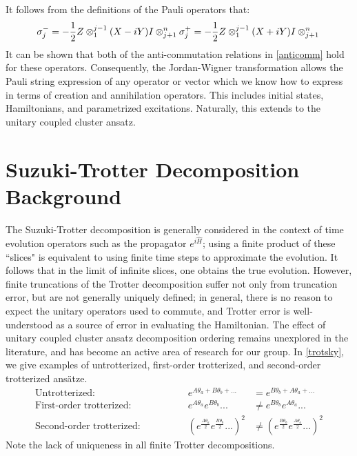 \documentclass{article}
\begin{document}
\begin{paragraph}{}
It follows from the definitions of the Pauli operators that: 
\begin{equation}\label{sigmat}
\sigma_j^- = -\frac{1}{2}Z\otimes_1^{j-1}(X-iY)I\otimes_{j+1}^n\\
\sigma_j^+ = -\frac{1}{2}Z\otimes_1^{j-1}(X+iY)I\otimes_{j+1}^n\\
\end{equation}
It can be shown that both of the anti-commutation relations in \ref{anticomm} hold for these operators.  Consequently, the Jordan-Wigner transformation allows the Pauli string expression of any operator or vector which we know how to express in terms of creation and annihilation operators.  This includes initial states, Hamiltonians, and parametrized excitations.  Naturally, this extends to the unitary coupled cluster ansatz.
\end{paragraph}
\section{Suzuki-Trotter Decomposition Background}\label{trot}
\begin{paragraph}{}
The Suzuki-Trotter decomposition is generally considered in the context of time evolution operators such as the propagator $e^{i\hat{H}}$; using a finite product of these ``slices" is equivalent to using finite time steps to approximate the evolution. \cite{hastings, babbush, suzuki} It follows that in the limit of infinite slices, one obtains the true evolution. \cite{suzuki} However, finite truncations of the Trotter decomposition suffer not only from truncation error, but are not generally uniquely defined; in general, there is no reason to expect the unitary operators used to commute, and Trotter error is well-understood as a source of error in evaluating the Hamiltonian. \cite{hastings}  The effect of unitary coupled cluster ansatz decomposition ordering remains unexplored in the literature, and has become an active area of research for our group.  In \ref{trotsky}, we give examples of untrotterized, first-order trotterized, and second-order trotterized ans{\"a}tze.
\begin{align}\label{trotsky}
\text{{Untrotterized:}}&\hspace{40pt}&e^{A\theta_a+B\theta_b+...}&=e^{B\theta_b+A\theta_a+...}\\
\text{{First-order trotterized:}}&&e^{A\theta_a}e^{B\theta_b}...&\neq e^{B\theta_b}e^{A\theta_a}...\nonumber\\
\text{{Second-order trotterized:}}&&\left(e^{\frac{A\theta_a}{2}}e^{\frac{B\theta_b}{2}}...\right)^2&\neq \left(e^{\frac{B\theta_b}{2}}e^{\frac{A\theta_a}{2}}...\right)^2\nonumber
\end{align}
Note the lack of uniqueness in all finite Trotter decompositions.
\end{paragraph}
\end{document}
